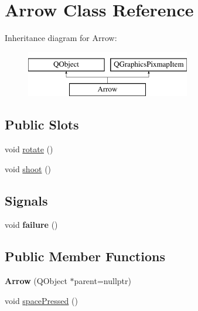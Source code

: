 \hypertarget{classArrow}{\section{Arrow Class Reference}
\label{classArrow}
}
Inheritance diagram for Arrow\-:\begin{figure}[H]
\begin{center}
\leavevmode
\includegraphics[height=2.000000cm]{classArrow}
\end{center}
\end{figure}
\subsection*{Public Slots}
\begin{DoxyCompactItemize}
\item 
void \hyperlink{classArrow_a0d1bc2ac783f879a9a1c8b86f7eda098}{rotate} ()
\item 
void \hyperlink{classArrow_a48fffc776d41b37884cbfa88c4da9f82}{shoot} ()
\end{DoxyCompactItemize}
\subsection*{Signals}
\begin{DoxyCompactItemize}
\item 
\hypertarget{classArrow_a8e9880f1d08a0bf13f2be7dd9066fea1}{void {\bfseries failure} ()}\label{classArrow_a8e9880f1d08a0bf13f2be7dd9066fea1}

\end{DoxyCompactItemize}
\subsection*{Public Member Functions}
\begin{DoxyCompactItemize}
\item 
\hypertarget{classArrow_a5c5eb1dbfab37de5824bab85b8753a44}{{\bfseries Arrow} (Q\-Object $\ast$parent=nullptr)}\label{classArrow_a5c5eb1dbfab37de5824bab85b8753a44}

\item 
void \hyperlink{classArrow_aa7f35e0a37363c63fb6de0b43f6ca20d}{space\-Pressed} ()
\end{DoxyCompactItemize}
